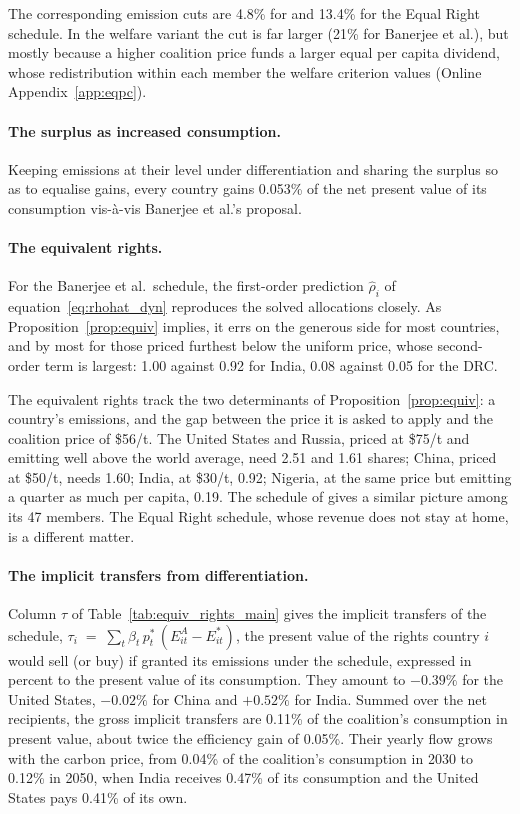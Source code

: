 \documentclass[12pt,english]{article}
\theoremstyle{remark}
\begin{document}
The corresponding emission cuts are 4.8\% for \citet{wolfram_building_2025} and 13.4\% for the Equal Right schedule. In the welfare variant the cut is far larger (21\% for Banerjee et al.), but mostly because a higher coalition price funds a larger equal per capita dividend, whose redistribution within each member the welfare criterion values (Online Appendix~\ref{app:eqpc}).

\paragraph{The surplus as increased consumption.} Keeping emissions at their level under differentiation and sharing the surplus so as to equalise gains, every country gains 0.053\% of the net present value of its consumption vis-à-vis Banerjee et al.'s proposal.

\paragraph{The equivalent rights.}

For the Banerjee et al.\ schedule, the first-order prediction $\hat\rho_i$ of equation~\eqref{eq:rhohat_dyn} reproduces the solved allocations closely. As Proposition~\ref{prop:equiv} implies, it errs on the generous side for most countries, and by most for those priced furthest below the uniform price, whose second-order term is largest: 1.00 against 0.92 for India, 0.08 against 0.05 for the DRC.

The equivalent rights track the two determinants of Proposition~\ref{prop:equiv}: a country's emissions, and the gap between the price it is asked to apply and the coalition price of \$56/t.
The United States and Russia, priced at \$75/t and emitting well above the world average, need 2.51 and 1.61 shares; China, priced at \$50/t, needs 1.60; India, at \$30/t, 0.92; Nigeria, at the same price but emitting a quarter as much per capita, 0.19. The schedule of \citet{wolfram_building_2025} gives a similar picture among its 47 members. The Equal Right schedule, whose revenue does not stay at home, is a different matter.

\paragraph{The implicit transfers from differentiation.} Column $\tau$ of Table~\ref{tab:equiv_rights_main} gives the implicit transfers of the \citet{banerjee_grand_2025} schedule, $\tau_i \;=\; \sum_t \beta_t\,p^*_t\,(E^A_{it}-E^*_{it})$,
the present value of the rights country $i$ would sell (or buy) if granted its emissions under the schedule, expressed in percent to the present value of its consumption. They amount to $-0.39\%$ for the United States, $-0.02\%$ for China and $+0.52\%$ for India. Summed over the net recipients, the gross implicit transfers are 0.11\% of the coalition's consumption in present value, about twice the efficiency gain of 0.05\%.
Their yearly flow grows with the carbon price, from
  0.04\% of the coalition's consumption in 2030
to 0.12\%
in 2050,
when India receives 0.47\% of its consumption and the United States pays 0.41\% of its own.
\end{document}
